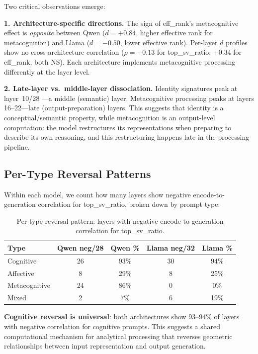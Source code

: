 \documentclass[11pt,a4paper]{article}
\begin{document}
Two critical observations emerge:

\textbf{1. Architecture-specific directions.} The sign of eff\_rank's metacognitive effect is \emph{opposite} between Qwen ($d = +0.84$, higher effective rank for metacognition) and Llama ($d = -0.50$, lower effective rank). Per-layer $d$ profiles show no cross-architecture correlation ($\rho = -0.13$ for top\_sv\_ratio, $+0.34$ for eff\_rank, both NS). Each architecture implements metacognitive processing differently at the layer level.

\textbf{2. Late-layer vs.\ middle-layer dissociation.} Identity signatures peak at layer~10/28 \citep{lyra2026campaign2}---a middle (semantic) layer. Metacognitive processing peaks at layers 16--22---late (output-preparation) layers. This suggests that identity is a conceptual/semantic property, while metacognition is an output-level computation: the model restructures its representations when preparing to describe its own reasoning, and this restructuring happens late in the processing pipeline.

\subsection{Per-Type Reversal Patterns}

Within each model, we count how many layers show negative encode-to-generation correlation for top\_sv\_ratio, broken down by prompt type:

\begin{table}[H]
\centering
\caption{Per-type reversal pattern: layers with negative encode-to-generation correlation for top\_sv\_ratio.}
\label{tab:reversal_per_type}
\begin{tabular}{lcccc}
\toprule
\textbf{Type} & \textbf{Qwen neg/28} & \textbf{Qwen \%} & \textbf{Llama neg/32} & \textbf{Llama \%} \\
\midrule
Cognitive      & 26 & 93\% & 30 & 94\% \\
Affective      & 8  & 29\% & 8  & 25\% \\
Metacognitive  & 24 & 86\% & 0  & 0\%  \\
Mixed          & 2  & 7\%  & 6  & 19\% \\
\bottomrule
\end{tabular}
\end{table}

\textbf{Cognitive reversal is universal}: both architectures show 93--94\% of layers with negative correlation for cognitive prompts. This suggests a shared computational mechanism for analytical processing that reverses geometric relationships between input representation and output generation.
\end{document}
